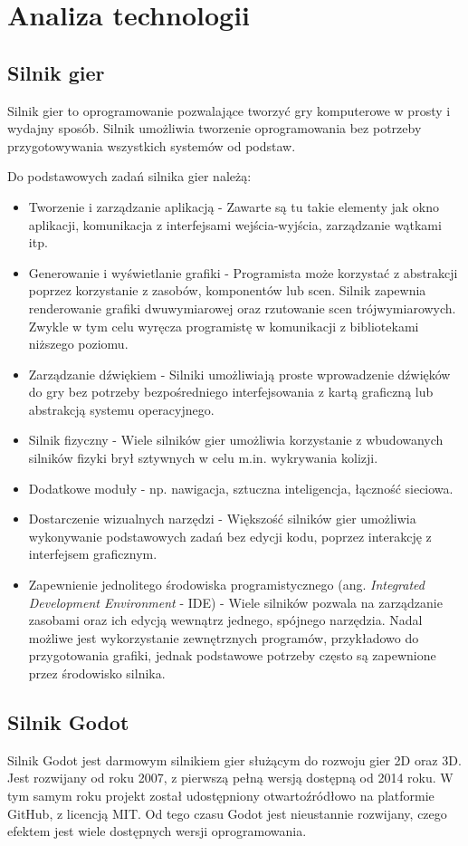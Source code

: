 \chapter{Analiza technologii}
\section{Silnik gier}
Silnik gier to oprogramowanie pozwalające tworzyć gry komputerowe w prosty i wydajny sposób. Silnik umożliwia tworzenie oprogramowania bez potrzeby przygotowywania wszystkich systemów od podstaw. 

Do podstawowych zadań silnika gier należą:
\begin{itemize}
    \item Tworzenie i zarządzanie aplikacją - Zawarte są tu takie elementy jak okno aplikacji, komunikacja z interfejsami wejścia-wyjścia, zarządzanie wątkami itp.
    \item Generowanie i wyświetlanie grafiki - Programista może korzystać z abstrakcji poprzez korzystanie z zasobów, komponentów lub scen. Silnik zapewnia renderowanie grafiki dwuwymiarowej oraz rzutowanie scen trójwymiarowych. Zwykle w tym celu wyręcza programistę w komunikacji z bibliotekami niższego poziomu. 
    \item Zarządzanie dźwiękiem - Silniki umożliwiają proste wprowadzenie dźwięków do gry bez potrzeby bezpośredniego interfejsowania z kartą graficzną lub abstrakcją systemu operacyjnego.
    \item Silnik fizyczny - Wiele silników gier umożliwia korzystanie z wbudowanych silników fizyki brył sztywnych w celu m.in. wykrywania kolizji.
    \item Dodatkowe moduły - np. nawigacja, sztuczna inteligencja, łączność sieciowa.

    \item Dostarczenie wizualnych narzędzi - Większość silników gier umożliwia wykonywanie podstawowych zadań bez edycji kodu, poprzez interakcję z interfejsem graficznym. 
    \item Zapewnienie jednolitego środowiska programistycznego (ang. \emph{Integrated Development Environment} - IDE) - Wiele silników pozwala na zarządzanie zasobami oraz ich edycją wewnątrz jednego, spójnego narzędzia. Nadal możliwe jest wykorzystanie zewnętrznych programów, przykładowo do przygotowania grafiki, jednak podstawowe potrzeby często są zapewnione przez środowisko silnika.
\end{itemize}

\section{Silnik Godot}
Silnik Godot\cite{godot_main} jest darmowym silnikiem gier służącym do rozwoju gier 2D oraz 3D. Jest rozwijany od roku 2007, z pierwszą pełną wersją dostępną od 2014 roku. W tym samym roku projekt został udostępniony otwartoźródłowo na platformie GitHub\cite{godot_github}, z licencją MIT. Od tego czasu Godot jest nieustannie rozwijany, czego efektem jest wiele dostępnych wersji oprogramowania. 

